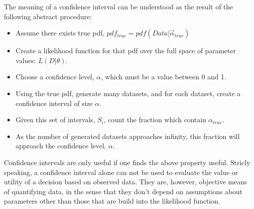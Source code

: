 The meaning of a confidence interval can be understood as the result of the following abstract procedure:
\begin{itemize}
  \item Assume there exists true pdf, $pdf_{true} = pdf(Data | \vec{\alpha}_{true})$ 
  \item Create a likelihood function for that pdf over the full space of parameter values: $L(D | \theta)$.
  \item Choose a confidence level, $\alpha$, which must be a value between 0 and 1.
  \item Using the true pdf, generate many datasets, and for each dataset, create a confidence interval of size $\alpha$. %
  \item Given this set of intervals, {$S_i$}, count the fraction which contain $\alpha_{true}$.
  \item As the number of generated datasets approaches infinity, this fraction will approach the confidence level, $\alpha$.
\end{itemize}

Confidence intervals are only useful if one finds the above property useful.
Stricly speaking, a confidence interval alone can not be used to evaluate the value or utility of a decision based on observed data.
They are, however, objective means of quantifying data, in the sense that they don't depend on assumptions about parameters other than those that are build into the likelihood function.

